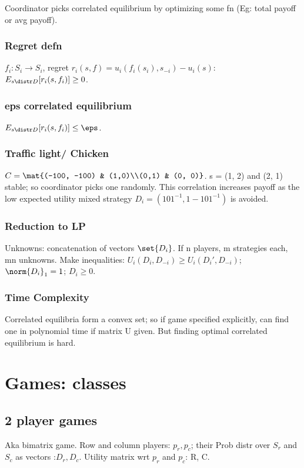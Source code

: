 \documentclass[oneside, article]{memoir}
\begin{document}
Coordinator picks correlated equilibrium by optimizing some fn (Eg: total payoff or avg payoff).

\subsection{Regret defn}
$f_{i}:S_{i} \to S_{i}$, regret $r_{i}(s,f) = u_{i}(f_{i}(s_{i}), s_{-i}) - u_{i}(s)$:\\
 $E_{s \distr D}[r_{i}(s,f_{i})] \geq 0$.

\subsection{eps correlated equilibrium}
$E_{s \distr D}[r_{i}(s,f_{i})] \leq \eps$.

\subsection{Traffic light/ Chicken} $C = \mat{(-100, -100) & (1,0)\\(0,1) & (0, 0)}$. s = (1, 2) and (2, 1) stable; so coordinator picks one randomly. This correlation increases payoff as the low expected utility mixed strategy $D_{i} = (101^{-1}, 1-101^{-1})$ is avoided.

\subsection{Reduction to LP}
Unknowns: concatenation of vectors $\set{D_{i}}$. If n players, m strategies each, mn unknowns. Make inequalities: $U_{i}(D_{i}, D_{-i}) \geq U_{i}(D_{i}', D_{-i})$; $\norm{D_{i}}_{1} = 1$; $D_{i} \geq 0$.

\tbc

\subsection{Time Complexity}
Correlated equilibria form a convex set; so if game specified explicitly, can find one in polynomial time if matrix U given. But finding optimal correlated equilibrium is hard. \tbc

\chapter{Games: classes}
\section{2 player games}
Aka bimatrix game. Row and column players: $p_{r}, p_{c}$; their Prob distr over $S_r$ and $S_{c}$ as vectors :$D_{r}, D_{c}$. Utility matrix wrt $p_{r}$ and $p_{c}$: R, C.
\end{document}
